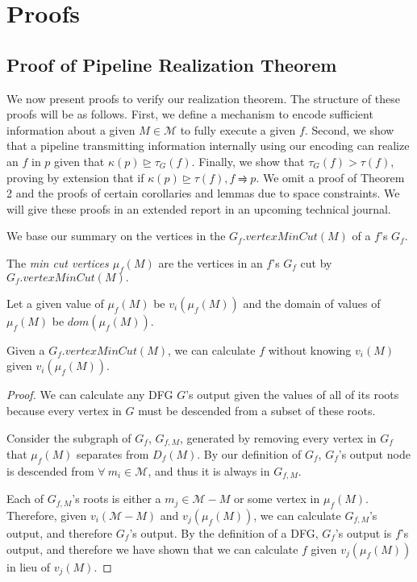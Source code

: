 \section{Proofs}
\label{sec:proofs}

\subsection{Proof of Pipeline Realization Theorem}

We now present proofs to verify our realization theorem. The structure of these proofs will be as follows. First, we define a mechanism to encode sufficient information about a given $M \in \mathcal{M}$ to fully execute a given $f$. Second, we show that a pipeline transmitting information internally using our encoding can realize an $f$ in $p$ given that $\kappa(p) \trianglerighteq \tau_G(f)$. Finally, we show that $\tau_G(f) > \tau(f)$, proving by extension that if $\kappa(p) \trianglerighteq \tau(f), f \rightrightharpoons p$. We omit a proof of Theorem 2 and the proofs of certain corollaries and lemmas due to space constraints. We will give these proofs in an extended report in an upcoming technical journal.

We base our summary on the vertices in the $G_f.vertexMinCut(M)$ of a $f$'s $G_f$. %

\begin{definition}
The {\em min cut vertices $\mu_f(M)$} are the vertices in an $f$'s $G_f$ cut by $G_f.vertexMinCut(M).$ 
\end{definition}

Let a given value of $\mu_f(M)$ be $v_i(\mu_f(M))$ and the domain of values of $\mu_f(M)$ be $dom(\mu_f(M))$. %

\begin{lemma}
\label{lemma:M-to-mu}
Given a $G_f.vertexMinCut(M)$, we can calculate $f$ without knowing $v_i(M)$ given $v_i(\mu_f(M))$.
\end{lemma}

\begin{proof}
We can calculate any DFG $G$'s output given the values of all of its roots because every vertex in $G$ must be descended from a subset of these roots.

Consider the subgraph of $G_f$, $G_{f,M}$, generated by removing every vertex in $G_f$ that $\mu_f(M)$ separates from $D_f(M)$. By our definition of $G_f$, $G_f$'s output node is descended from $\forall\ m_i \in \mathcal{M}$, and thus it is always in $G_{f,M}$.

Each of $G_{f,M}$'s roots is either a $m_j \in \mathcal{M} - M$ or some vertex in $\mu_f(M)$. Therefore, given $v_i(\mathcal{M} - M)$ and $v_j(\mu_f(M))$, we can calculate $G_{f,M}$'s output, and therefore $G_f$'s output. By the definition of a DFG, $G_f$'s output is $f$'s output, and therefore we have shown that we can calculate $f$ given $v_j(\mu_f(M))$ in lieu of $v_j(M)$.
\end{proof}

